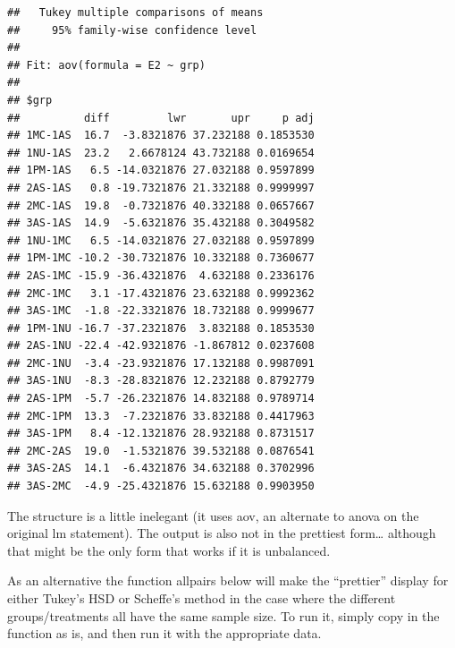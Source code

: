 \documentclass[
]{book}
\begin{document}
\begin{verbatim}
##   Tukey multiple comparisons of means
##     95% family-wise confidence level
## 
## Fit: aov(formula = E2 ~ grp)
## 
## $grp
##          diff         lwr       upr     p adj
## 1MC-1AS  16.7  -3.8321876 37.232188 0.1853530
## 1NU-1AS  23.2   2.6678124 43.732188 0.0169654
## 1PM-1AS   6.5 -14.0321876 27.032188 0.9597899
## 2AS-1AS   0.8 -19.7321876 21.332188 0.9999997
## 2MC-1AS  19.8  -0.7321876 40.332188 0.0657667
## 3AS-1AS  14.9  -5.6321876 35.432188 0.3049582
## 1NU-1MC   6.5 -14.0321876 27.032188 0.9597899
## 1PM-1MC -10.2 -30.7321876 10.332188 0.7360677
## 2AS-1MC -15.9 -36.4321876  4.632188 0.2336176
## 2MC-1MC   3.1 -17.4321876 23.632188 0.9992362
## 3AS-1MC  -1.8 -22.3321876 18.732188 0.9999677
## 1PM-1NU -16.7 -37.2321876  3.832188 0.1853530
## 2AS-1NU -22.4 -42.9321876 -1.867812 0.0237608
## 2MC-1NU  -3.4 -23.9321876 17.132188 0.9987091
## 3AS-1NU  -8.3 -28.8321876 12.232188 0.8792779
## 2AS-1PM  -5.7 -26.2321876 14.832188 0.9789714
## 2MC-1PM  13.3  -7.2321876 33.832188 0.4417963
## 3AS-1PM   8.4 -12.1321876 28.932188 0.8731517
## 2MC-2AS  19.0  -1.5321876 39.532188 0.0876541
## 3AS-2AS  14.1  -6.4321876 34.632188 0.3702996
## 3AS-2MC  -4.9 -25.4321876 15.632188 0.9903950
\end{verbatim}

The structure is a little inelegant (it uses aov, an alternate to anova on the original lm statement). The output is also not in the prettiest form\ldots{} although that might be the only form that works if it is unbalanced.

As an alternative the function allpairs below will make the ``prettier'' display for either Tukey's HSD or Scheffe's method in the case where the different groups/treatments all have the same sample size. To run it, simply copy in the function as is, and then run it with the appropriate data.
\end{document}
